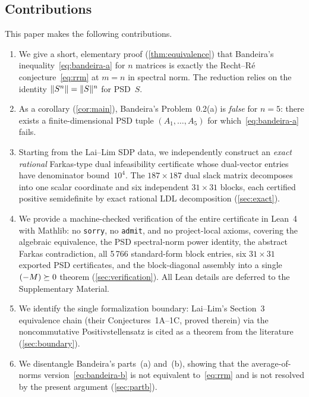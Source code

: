\subsection*{Contributions}
This paper makes the following contributions.
\begin{enumerate}[label=(\roman*),leftmargin=2em]
  \item We give a short, elementary proof
    (\cref{thm:equivalence}) that Bandeira's
    inequality~\eqref{eq:bandeira-a} for $n$ matrices is exactly the
    Recht--R\'e conjecture~\eqref{eq:rrm} at $m=n$ in spectral norm.
    The reduction relies on the identity
    $\lVert S^n\rVert=\lVert S\rVert^n$ for PSD~$S$.
  \item As a corollary (\cref{cor:main}), Bandeira's
    Problem~0.2(a) is \emph{false} for $n=5$: there exists a
    finite-dimensional PSD tuple
    $(A_1,\dots,A_5)$ for which~\eqref{eq:bandeira-a} fails.
  \item Starting from the Lai--Lim SDP data, we independently
    construct an \emph{exact rational} Farkas-type dual infeasibility
    certificate whose dual-vector entries have denominator bound~$10^4$.
    The $187{\times}187$ dual slack matrix decomposes into one scalar
    coordinate and six independent $31{\times}31$ blocks, each
    certified positive semidefinite by exact rational LDL decomposition
    (\cref{sec:exact}).
  \item We provide a machine-checked verification of the entire
    certificate in Lean~4 with Mathlib: no \texttt{sorry}, no
    \texttt{admit}, and no project-local axioms, covering the algebraic
    equivalence, the PSD spectral-norm power identity, the abstract
    Farkas contradiction, all 5\,766 standard-form block entries,
    six $31{\times}31$ exported PSD certificates, and the
    block-diagonal assembly into a single $(-M)\succeq 0$ theorem
    (\cref{sec:verification}).  All Lean details are deferred to
    the Supplementary Material.
  \item We identify the single formalization boundary: Lai--Lim's
    Section~3 equivalence chain (their Conjectures~1A--1C, proved
    therein) via the noncommutative Positivstellensatz is cited as a
    theorem from the literature (\cref{sec:boundary}).
  \item We disentangle Bandeira's parts~(a) and~(b), showing that
    the average-of-norms version~\eqref{eq:bandeira-b} is not
    equivalent to~\eqref{eq:rrm} and is not resolved by the present
    argument (\cref{sec:partb}).
\end{enumerate}

